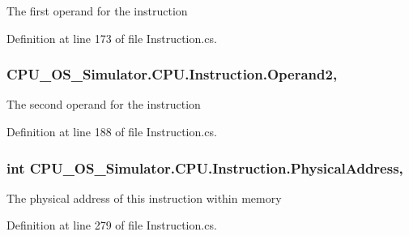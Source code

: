 The first operand for the instruction 



Definition at line 173 of file Instruction.\+cs.

\hypertarget{class_c_p_u___o_s___simulator_1_1_c_p_u_1_1_instruction_ab35e6667e7c2f42dd09965995e25ff2d}{}
\subsubsection[{Operand2}]{ C\+P\+U\+\_\+\+O\+S\+\_\+\+Simulator.\+C\+P\+U.\+Instruction.\+Operand2\hspace{0.3cm}{\ttfamily [get]}, {\ttfamily [set]}}\label{class_c_p_u___o_s___simulator_1_1_c_p_u_1_1_instruction_ab35e6667e7c2f42dd09965995e25ff2d}


The second operand for the instruction 



Definition at line 188 of file Instruction.\+cs.

\hypertarget{class_c_p_u___o_s___simulator_1_1_c_p_u_1_1_instruction_a97b20c8a0a7536bdddd8e791605a8bac}{}
\subsubsection[{Physical\+Address}]{\setlength{\rightskip}{0pt plus 5cm}int C\+P\+U\+\_\+\+O\+S\+\_\+\+Simulator.\+C\+P\+U.\+Instruction.\+Physical\+Address\hspace{0.3cm}{\ttfamily [get]}, {\ttfamily [set]}}\label{class_c_p_u___o_s___simulator_1_1_c_p_u_1_1_instruction_a97b20c8a0a7536bdddd8e791605a8bac}


The physical address of this instruction within memory 



Definition at line 279 of file Instruction.\+cs.


